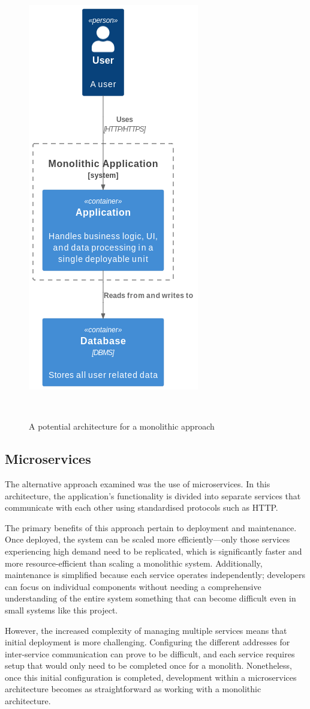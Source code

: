 \begin{figure} [H]
    \centering
    \includegraphics[width=0.35\linewidth]{figures/monolithic_arch.png}
    \caption{A potential architecture for a monolithic approach}
~\label{fig:monolith-arch}
\end{figure}

\subsection{Microservices}
The alternative approach examined was the use of microservices. In this architecture, the application's functionality is divided into separate services that communicate with each other using standardised protocols such as HTTP.\@

The primary benefits of this approach pertain to deployment and maintenance. Once deployed, the system can be scaled more efficiently—only those services experiencing high demand need to be replicated, which is significantly faster and more resource-efficient than scaling a monolithic system. Additionally, maintenance is simplified because each service operates independently; developers can focus on individual components without needing a comprehensive understanding of the entire system something that can become difficult even in small systems like this project.

However, the increased complexity of managing multiple services means that initial deployment is more challenging. Configuring the different addresses for inter-service communication can prove to be difficult, and each service requires setup that would only need to be completed once for a monolith. Nonetheless, once this initial configuration is completed, development within a microservices architecture becomes as straightforward as working with a monolithic architecture.

